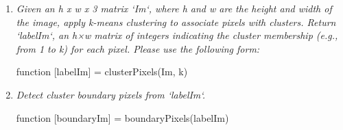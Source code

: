 \documentclass[11pt]{article}
\begin{document}
    \begin{enumerate}
        \item \textit{Given an h x w x 3 matrix ‘Im‘, where h and w are the height and width of the image, apply
        k-means clustering to associate pixels with clusters. Return ‘labelIm‘, an h×w matrix of integers indicating
        the cluster membership (e.g., from 1 to k) for each pixel.
        Please use the following form:}\newline
        \begin{center}
            function [labelIm] = clusterPixels(Im, k)
        \end{center}

        \item \textit{Detect cluster boundary pixels from ‘labelIm‘.}\newline
        \begin{center}
            function [boundaryIm] = boundaryPixels(labelIm)
        \end{center}


\end{enumerate}
\end{document}
